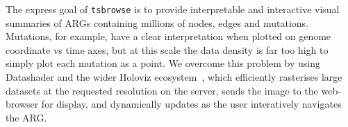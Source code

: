 \documentclass[unnumsec,webpdf,contemporary,large,namedate]{oup-authoring-template}%
\begin{document}
The express goal of \texttt{tsbrowse} is to provide interpretable
and interactive visual summaries of ARGs containing millions of nodes, edges 
and mutations. Mutations, for example, have a clear interpretation
when plotted on genome coordinate vs time axes, but at this scale 
the data density is far too high to simply plot each mutation as a point.
We overcome this problem by using Datashader and the wider 
Holoviz ecosystem~\citep{Holoviz}, which efficiently rasterises large datasets
at the requested resolution on the server, sends the image to the web-browser
for display, and dynamically updates as the user interatively navigates the ARG.


\end{document}
